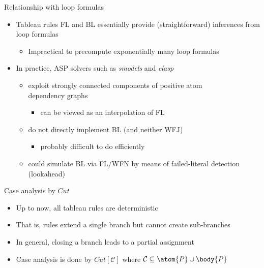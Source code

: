 \begin{frame}{Relationship with loop formulas}
  \bigskip
  \begin{itemize}
  \item <1-> Tableau rules FL and BL essentially provide (straightforward) inferences from loop formulas
    \begin{itemize}
    \item Impractical to precompute exponentially many loop formulas
    \end{itemize}
    \medskip
  \item <2-> In practice, ASP solvers such as \textit{smodels} and \textit{clasp}
    \begin{itemize}
    \item exploit strongly connected components of positive atom\\ dependency graphs
      \begin{itemize}
      \item can be viewed as an interpolation of FL
      \end{itemize}
    \item <3-> do not directly implement BL (and neither WFJ)
      \begin{itemize}
      \item probably difficult to do efficiently
      \end{itemize}
    \item <4-> could simulate BL via FL/WFN by means of failed-literal detection (lookahead)
    \end{itemize}
  \end{itemize}
\end{frame}
\begin{frame}{Case analysis by $\textit{Cut}$}
  \bigskip
  \begin{itemize}
  \item <1-> Up to now, all tableau rules are deterministic
  \item [] That is, rules extend a single branch but cannot create sub-branches
    \smallskip
  \item <2-> In general, closing a branch leads to a partial assignment
    \smallskip
  \item <3-> Case analysis is done by $\textit{Cut}[{\mathcal{C}}]$ where
    ${\mathcal{C}} \subseteq \atom{P} \cup \body{P}$
  \end{itemize}
\end{frame}
